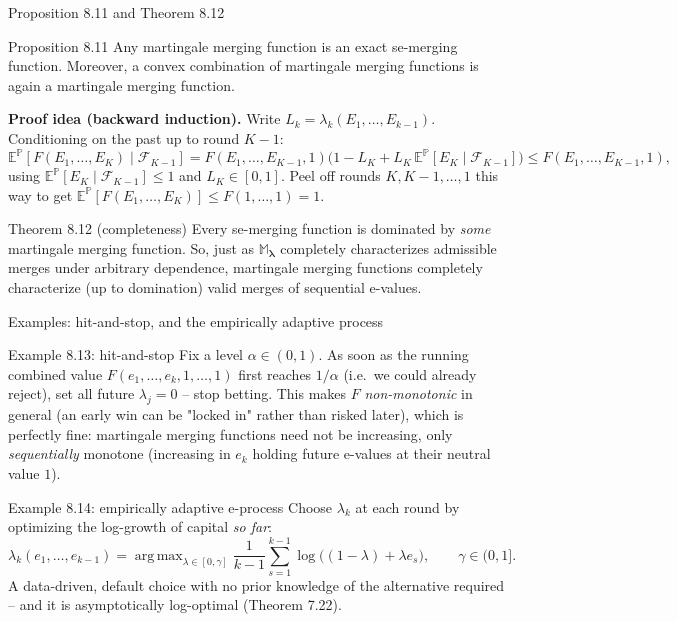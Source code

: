 \documentclass[aspectratio=169,10pt]{beamer}
\newcommand{\E}{\mathbb{E}}
\newcommand{\Pb}{\mathbb{P}}
\newcommand{\calF}{\mathcal{F}}
\DeclareMathOperator*{\argmax}{arg\,max}
\begin{document}
\begin{frame}{Proposition 8.11 and Theorem 8.12}
  \begin{block}{Proposition 8.11}
    Any martingale merging function is an exact se-merging function. Moreover, a convex combination of martingale merging functions is again a martingale merging function.
  \end{block}
  \textbf{Proof idea (backward induction).} Write $L_k = \lambda_k(E_1,\dots,E_{k-1})$. Conditioning on the past up to round $K-1$:
  \[
    \E^{\Pb}[F(E_1,\dots,E_K) \mid \calF_{K-1}] = F(E_1,\dots,E_{K-1},1)\big(1 - L_K + L_K \,\E^{\Pb}[E_K\mid \calF_{K-1}]\big) \leq F(E_1,\dots,E_{K-1},1),
  \]
  using $\E^{\Pb}[E_K \mid \calF_{K-1}] \leq 1$ and $L_K \in [0,1]$. Peel off rounds $K, K-1, \dots, 1$ this way to get $\E^{\Pb}[F(E_1,\dots,E_K)] \leq F(1,\dots,1) = 1$.

  \begin{block}{Theorem 8.12 (completeness)}
    Every se-merging function is dominated by \emph{some} martingale merging function. So, just as $\mathbb{M}_{\boldsymbol\lambda}$ completely characterizes admissible merges under arbitrary dependence, martingale merging functions completely characterize (up to domination) valid merges of sequential e-values.
  \end{block}
\end{frame}

\begin{frame}{Examples: hit-and-stop, and the empirically adaptive process}
  \begin{block}{Example 8.13: hit-and-stop}
    Fix a level $\alpha \in (0,1)$. As soon as the running combined value $F(e_1,\dots,e_k,1,\dots,1)$ first reaches $1/\alpha$ (i.e.\ we could already reject), set all future $\lambda_j=0$ -- stop betting. This makes $F$ \emph{non-monotonic} in general (an early win can be "locked in" rather than risked later), which is perfectly fine: martingale merging functions need not be increasing, only \emph{sequentially} monotone (increasing in $e_k$ holding future e-values at their neutral value $1$).
  \end{block}
  \begin{block}{Example 8.14: empirically adaptive e-process}
    Choose $\lambda_k$ at each round by optimizing the log-growth of capital \emph{so far}:
    \[
      \lambda_k(e_1,\dots,e_{k-1}) = \argmax_{\lambda \in [0,\gamma]} \frac{1}{k-1}\sum_{s=1}^{k-1} \log\big((1-\lambda)+\lambda e_s\big), \qquad \gamma \in (0,1].
    \]
    A data-driven, default choice with no prior knowledge of the alternative required -- and it is asymptotically log-optimal (Theorem 7.22).
  \end{block}
\end{frame}
\end{document}
